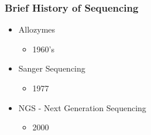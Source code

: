 \documentclass{beamer}
\begin{document}
\begin{frame}
\frametitle{Brief History of Sequencing}
\begin{itemize}
	\item Allozymes
	\begin{itemize}
		\item 1960's
	\end{itemize}
	\item Sanger Sequencing
	\begin{itemize}
		\item 1977
	\end{itemize}
	\item NGS - Next Generation Sequencing
	\begin{itemize}
		\item 2000
	\end{itemize}
\end{itemize}
\end{frame}
\end{document}
